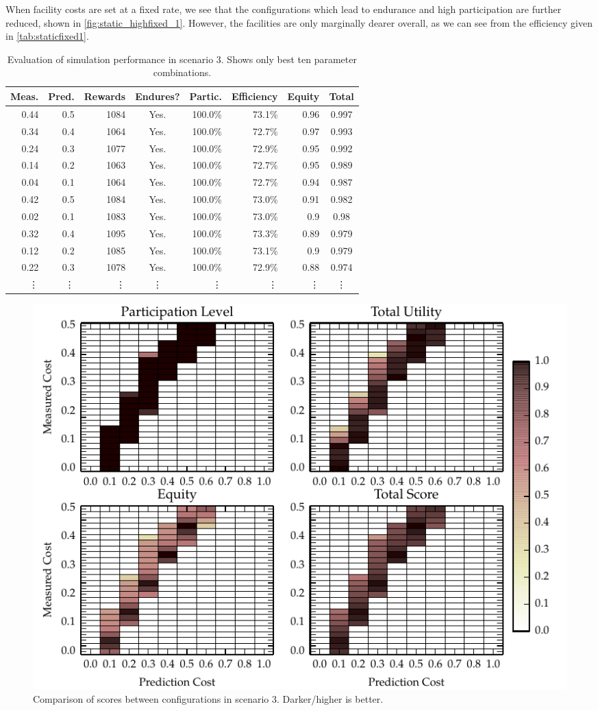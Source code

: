 When facility costs are set at a fixed rate, we see that the configurations
which lead to endurance and high participation are further reduced, shown in
\autoref{fig:static_highfixed_1}. However, the facilities are only marginally
dearer overall, as we can see from the efficiency given in
\autoref{tab:staticfixed1}.

\begin{table}
\centering
\caption{Evaluation of simulation performance in scenario 3. Shows only best ten parameter combinations.}\label{tab:staticfixed1}
\begin{tabular}{rr|rcrrr|c}
Meas. & Pred. & Rewards & Endures? & Partic. & Efficiency & Equity & Total \\
\hline
0.44 & 0.5 & 1084 & Yes. & 100.0\% & 73.1\% & 0.96 & 0.997 \\
0.34 & 0.4 & 1064 & Yes. & 100.0\% & 72.7\% & 0.97 & 0.993 \\
0.24 & 0.3 & 1077 & Yes. & 100.0\% & 72.9\% & 0.95 & 0.992 \\
0.14 & 0.2 & 1063 & Yes. & 100.0\% & 72.7\% & 0.95 & 0.989 \\
0.04 & 0.1 & 1064 & Yes. & 100.0\% & 72.7\% & 0.94 & 0.987 \\
0.42 & 0.5 & 1084 & Yes. & 100.0\% & 73.0\% & 0.91 & 0.982 \\
0.02 & 0.1 & 1083 & Yes. & 100.0\% & 73.0\% & 0.9 & 0.98 \\
0.32 & 0.4 & 1095 & Yes. & 100.0\% & 73.3\% & 0.89 & 0.979 \\
0.12 & 0.2 & 1085 & Yes. & 100.0\% & 73.1\% & 0.9 & 0.979 \\
0.22 & 0.3 & 1078 & Yes. & 100.0\% & 72.9\% & 0.88 & 0.974 \\
\vdots & \vdots & \vdots & \vdots & \vdots & \vdots & \vdots & \vdots \\
\end{tabular}
\end{table}

\begin{figure}
\includegraphics{gfx/kc/static_highfixed_1.pdf} 
\caption[Comparison of scores between configurations in scenario 3.]{Comparison of scores between configurations in scenario 3. Darker/higher is better.}\label{fig:static_highfixed_1}
\end{figure}

